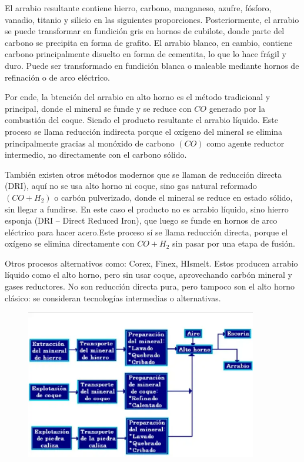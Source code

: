 \documentclass[12pt,a4paper]{article}
\begin{document}
El arrabio resultante contiene hierro, carbono, manganeso, azufre, fósforo, vanadio, titanio y silicio en las siguientes proporciones. 
Posteriormente, el arrabio se puede transformar en fundición gris en hornos de cubilote, donde parte del carbono se precipita en forma de grafito.
El arrabio blanco, en cambio, contiene carbono principalmente disuelto en forma de cementita, lo que lo hace frágil y duro. Puede ser transformado en fundición blanca o maleable mediante hornos de refinación o de arco eléctrico.

Por ende, la btención del arrabio en alto horno es el método tradicional y principal, donde el mineral se funde y se reduce con $CO$ generado por la combustión del coque. Siendo el producto resultante el arrabio líquido.
Este proceso se llama reducción indirecta porque el oxígeno del mineral se elimina principalmente gracias al monóxido de carbono $(CO)$ como agente reductor intermedio, no directamente con el carbono sólido.

También existen otros métodos modernos que se llaman de reducción directa (DRI), aquí no se usa alto horno ni coque, sino gas natural reformado $(CO + H_2)$ o carbón pulverizado, donde el mineral se reduce en estado sólido, sin llegar a fundirse. En este caso el producto no es arrabio líquido, sino hierro esponja (DRI – Direct Reduced Iron), que luego se funde en hornos de arco eléctrico para hacer acero.Este proceso sí se llama reducción directa, porque el oxígeno se elimina directamente con $CO + H_2$ sin pasar por una etapa de fusión.

Otros procesos alternativos como: Corex, Finex, HIsmelt. Estos producen arrabio líquido como el alto horno, pero sin usar coque, aprovechando carbón mineral y gases reductores. No son reducción directa pura, pero tampoco son el alto horno clásico: se consideran tecnologías intermedias o alternativas.

\begin{figure}[H]    
    \centering         
    \includegraphics[width=0.9\textwidth]{Inagenes para latex/obtencion de arrabio.png}
\end{figure}
\end{document}
